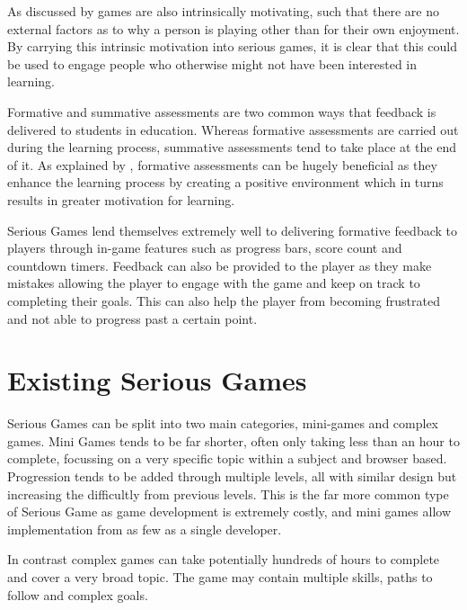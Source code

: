 \documentclass[12pt,a4paper]{report}
\begin{document}
As discussed by \cite{malone1981toward} games are also intrinsically motivating, such that there are no external factors as to why a person is playing other than for their own enjoyment. By carrying this intrinsic motivation into serious games, it is clear that this could be used to engage people who otherwise might not have been interested in learning. 

Formative and summative assessments are two common ways that feedback is delivered to students in education. Whereas formative assessments are carried out during the learning process, summative assessments tend to take place at the end of it. As explained by \cite{irons2007enhancing}, formative assessments can be hugely beneficial as they enhance the learning process by creating a positive environment which in turns results in greater motivation for learning. 

Serious Games lend themselves extremely well to delivering formative feedback to players through in-game features such as progress bars, score count and countdown timers. Feedback can also be provided to the player as they make mistakes allowing the player to engage with the game and keep on track to completing their goals. This can also help the player from becoming frustrated and not able to progress past a certain point.


\section{Existing Serious Games}
Serious Games can be split into two main categories, mini-games and complex games. Mini Games tends to be far shorter, often only taking less than an hour to complete, focussing on a very specific topic within a subject and browser based. Progression tends to be added through multiple levels, all with similar design but increasing the difficultly from previous levels. This is the far more common type of Serious Game as game development is extremely costly, and mini games allow implementation from as few as a single developer.

In contrast complex games can take potentially hundreds of hours to complete and cover a very broad topic. The game may contain multiple skills, paths to follow and complex goals. 
\end{document}

